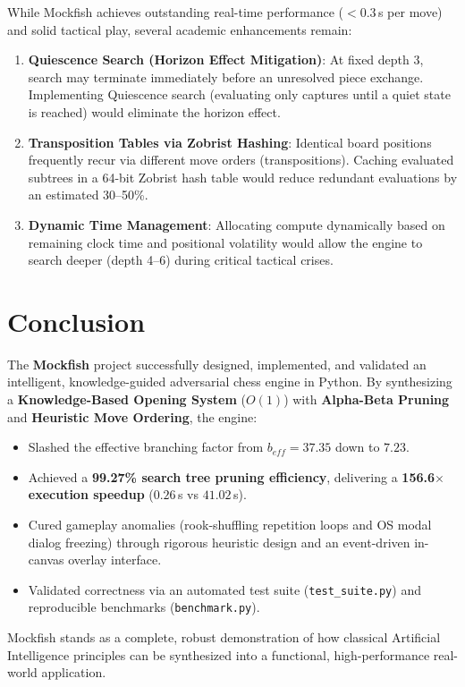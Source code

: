\documentclass[11pt,a4paper]{article}
\begin{document}
While Mockfish achieves outstanding real-time performance ($<0.3$\,s per move) and solid tactical play, several academic enhancements remain:
\begin{enumerate}[leftmargin=*]
    \item \textbf{Quiescence Search (Horizon Effect Mitigation)}: At fixed depth 3, search may terminate immediately before an unresolved piece exchange. Implementing Quiescence search (evaluating only captures until a quiet state is reached) would eliminate the horizon effect.
    \item \textbf{Transposition Tables via Zobrist Hashing}: Identical board positions frequently recur via different move orders (transpositions). Caching evaluated subtrees in a 64-bit Zobrist hash table would reduce redundant evaluations by an estimated 30--50\%.
    \item \textbf{Dynamic Time Management}: Allocating compute dynamically based on remaining clock time and positional volatility would allow the engine to search deeper (depth 4--6) during critical tactical crises.
\end{enumerate}

\section{Conclusion}

The \textbf{Mockfish} project successfully designed, implemented, and validated an intelligent, knowledge-guided adversarial chess engine in Python. By synthesizing a \textbf{Knowledge-Based Opening System} ($O(1)$) with \textbf{Alpha-Beta Pruning} and \textbf{Heuristic Move Ordering}, the engine:
\begin{itemize}[leftmargin=*]
    \item Slashed the effective branching factor from $b_{eff} = 37.35$ down to $7.23$.
    \item Achieved a \textbf{99.27\% search tree pruning efficiency}, delivering a \textbf{156.6$\times$ execution speedup} ($0.26$\,s vs $41.02$\,s).
    \item Cured gameplay anomalies (rook-shuffling repetition loops and OS modal dialog freezing) through rigorous heuristic design and an event-driven in-canvas overlay interface.
    \item Validated correctness via an automated test suite (\texttt{test\_suite.py}) and reproducible benchmarks (\texttt{benchmark.py}).
\end{itemize}
Mockfish stands as a complete, robust demonstration of how classical Artificial Intelligence principles can be synthesized into a functional, high-performance real-world application.
\end{document}
